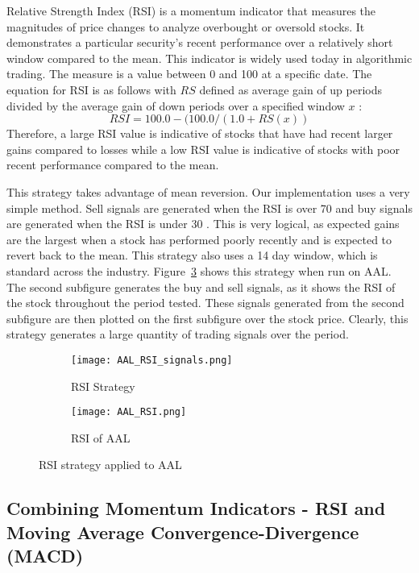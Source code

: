 \documentclass[../thesis.tex]{subfiles}
\begin{document}
Relative Strength Index (RSI) is a momentum indicator that measures the magnitudes of price changes to analyze overbought or oversold stocks. It demonstrates a particular security's recent performance over a relatively short window compared to the mean. This indicator is widely used today in algorithmic trading. The measure is a value between 0 and 100 at a specific date. The equation for RSI is as follows with $RS$ defined as average gain of up periods divided by the average gain of down periods over a specified window $x$ \cite{Chong2014}: \[RSI = 100.0 - (100.0 / (1.0 + RS(x))\] Therefore, a large RSI value is indicative of stocks that have had recent larger gains compared to losses while a low RSI value is indicative of stocks with poor recent performance compared to the mean.

This strategy takes advantage of mean reversion. Our implementation uses a very simple method. Sell signals are generated when the RSI is over 70 and buy signals are generated when the RSI is under 30 \cite{Chong2014}. This is very logical, as expected gains are the largest when a stock has performed poorly recently and is expected to revert back to the mean. This strategy also uses a 14 day window, which is standard across the industry. Figure~\ref{RSIfigure} shows this strategy when run on AAL. The second subfigure generates the buy and sell signals, as it shows the RSI of the stock throughout the period tested. These signals generated from the second subfigure are then plotted on the first subfigure over the stock price. Clearly, this strategy generates a large quantity of trading signals over the period.

\begin{figure}[h]
\centering

\begin{subfigure}[t]{0.45\textwidth}
\texttt{[image: AAL\_RSI\_signals.png]}
\caption{RSI Strategy \label{overflow}}
\end{subfigure}
\begin{subfigure}[t]{0.45\textwidth}
\texttt{[image: AAL\_RSI.png]}
\caption{ RSI of AAL \label{overflow}}
\end{subfigure}

\caption{RSI strategy applied to AAL  \label{overflow}}
\label{RSIfigure}
\end{figure}

\subsection{Combining Momentum Indicators - RSI and Moving Average Convergence-Divergence (MACD)}
\end{document}
